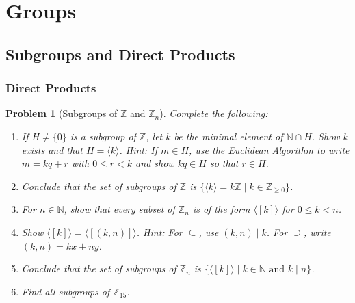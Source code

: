 \documentclass[12pt]{article}
\newcommand{\Z}{\mathbb{Z}}
\newcommand{\N}{\mathbb{N}}
\newtheorem{problem}{Problem}
\numberwithin{problem}{section} %
\theoremstyle{remark}  %
\begin{document}
 
%
\rhead{\today}

\section{Groups}
\setcounter{subsection}{2}
\subsection{Subgroups and Direct Products}
\subsubsection{Direct Products}
\setcounter{problem}{62}
    \begin{problem}[Subgroups of $\Z$ and $\Z_n$]
        Complete the following:
        \begin{enumerate}[label=(\alph*)]
            \item If $H \neq \{0\}$ is a subgroup of $\Z$, let $k$ be the minimal element of $\N \cap H$. Show $k$ exists and that $H = \langle k \rangle$. Hint: If $m\in H$, use the Euclidean Algorithm to write $m=kq+r$ with $0\leq r < k$ and show $kq \in H$ so that $r\in H$.
            \item Conclude that the set of subgroups of $\Z$ is $\{\langle k \rangle = k\Z \mid k \in \Z_{\geq 0}\}$.
            \item For $n\in\N$, show that every subset of $\Z_n$ is of the form $\langle [k] \rangle$ for $0\leq k < n$.
            \item Show $\langle [k] \rangle = \langle [(k,n)] \rangle$. Hint: For $\subseteq$, use $(k,n) \mid k$. For $\supseteq$, write $(k,n) = kx+ny$.
            \item Conclude that the set of subgroups of $\mathbb{Z}_n$ is $\{\langle [k] \rangle \mid k \in \mathbb{N}\text{ and } k\mid n\}$.
            \item Find all subgroups of $\mathbb{Z}_{15}$.      
        \end{enumerate}
    \end{problem}
\end{document}

